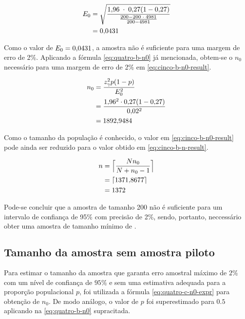 	\begin{align}
		\label{eq:cinco-b-e0-calc}
		E_0 &= \sqrt{\frac{\num{1.96} \;\cdot\; \num{0.27} (1 - \num{0.27}) }{\frac{200 - 200 \;\cdot\; 4981}{200 - 4981}}} \\
			&= \num{0.0431} \nonumber
	\end{align}

	Como o valor de $E_0 = \num{0.0431}$, a amostra não é suficiente para uma
	margem de erro de 2\%. Aplicando a fórmula \eqref{eq:quatro-b-n0} já
	mencionada, obtem-se o $n_0$ necessário para uma margem de erro de 2\%
	em \eqref{eq:cinco-b-n0-result}.

	\begin{align}
		n_0 &= \frac{z_\gamma^2 p(1-p)}{E_0^2} \nonumber \\
			&= \frac{\num{1.96}^2 \cdot \num{0.27}(1-\num{0.27})}{\num{0.02}^2} \nonumber \\
			&= \label{eq:cinco-b-n0-result}
			   \num{1892.9484}	
	\end{align}

	Como o tamanho da população é conhecido, o valor em
	\eqref{eq:cinco-b-n0-result} pode ainda ser reduzido para o valor obtido
	em \eqref{eq:cinco-b-n-result}.

	\begin{align}
		n &= \Big\lceil \frac{N n_0}{N + n_0 - 1} \nonumber \Big\rceil \\
		  &= \lceil \num{1371.8677} \nonumber \rceil \\
		  &= \label{eq:cinco-b-n-result} 
			 1372
	\end{align}

	Pode-se concluir que a amostra de tamanho 200 não é suficiente para um
	intervalo de confiança de 95\% com precisão de 2\%, sendo, portanto,
	neccessário obter uma amostra de tamanho mínimo de \CINCOBnceil.

\subsection{Tamanho da amostra sem amostra piloto}

	Para estimar o tamanho da amostra que garanta erro amostral máximo de
	$2\%$ com um nível de confiança de $95\%$ e sem uma estimativa adequada
	para a proporção populacional $p$, foi utilizada a fórmula
	\eqref{eq:quatro-c-n0-expr} para obtenção de $n_0$.  
	De modo análogo, o valor de $p$ foi superestimado para $\num{0.5}$ 
	aplicando na \autoref{eq:quatro-b-n0} supracitada.

